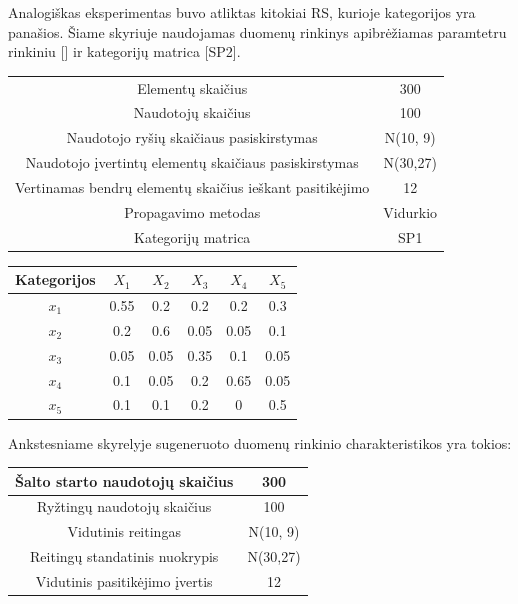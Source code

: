 \documentclass{VUMIFInfMagistrinis}
\begin{document}
\indent 
Analogiškas eksperimentas buvo atliktas kitokiai RS, kurioje kategorijos yra panašios. Šiame skyriuje naudojamas duomenų rinkinys apibrėžiamas paramtetru rinkiniu [] ir kategorijų matrica [SP2].
\begin{center}
	\begin{tabular}{||c c||} 
		
		
		Elementų skaičius & 300 \\
		Naudotojų skaičius & 100 \\
		Naudotojo ryšių skaičiaus pasiskirstymas &  N(10, 9) \\
		Naudotojo įvertintų elementų skaičiaus pasiskirstymas & N(30,27) \\
		Vertinamas bendrų elementų skaičius ieškant pasitikėjimo & 12 \\
		Propagavimo metodas & Vidurkio\\
		Kategorijų matrica & SP1 \\
	\end{tabular}
	
\end{center}
\begin{center}
	\begin{tabular}{||c c c c c c||} 
		\hline
		Kategorijos & $X_1$ & $X_2$ & $X_3$ & $X_4$ & $X_5$ \\ [0.5ex] 
		\hline\hline
		$x_1$ & 0.55 & 0.2 & 0.2 & 0.2 & 0.3 \\ 
		\hline
		$x_2$ & 0.2 & 0.6 & 0.05 & 0.05 & 0.1 \\
		\hline
		$x_3$ & 0.05 & 0.05 & 0.35 & 0.1 & 0.05 \\
		\hline
		$x_4$ & 0.1 & 0.05 & 0.2 & 0.65 & 0.05 \\
		\hline
		$x_5$ & 0.1 & 0.1 & 0.2 & 0 & 0.5 \\ [1ex] 
		\hline
	\end{tabular}
\end{center}
Ankstesniame skyrelyje sugeneruoto duomenų rinkinio charakteristikos yra tokios:
\begin{center}
	\begin{tabular}{||c c||} 
		Šalto starto naudotojų skaičius & 300 \\
		\hline
		Ryžtingų naudotojų skaičius  & 100 \\
		\hline
		Vidutinis reitingas &  N(10, 9) \\
		\hline
		Reitingų standatinis nuokrypis & N(30,27) \\
		\hline
		Vidutinis pasitikėjimo įvertis & 12 \\
	\end{tabular}
\end{center}
\end{document}
